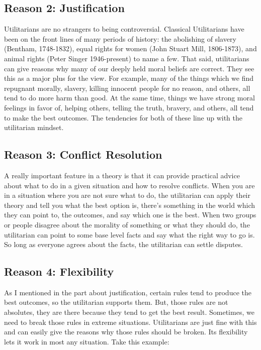 \subsection{Reason 2: Justification}

Utilitarians are no strangers to being controversial. Classical Utilitarians have been on the front lines of many periods of history: the abolishing of slavery (Bentham, 1748-1832), equal rights for women (John Stuart Mill, 1806-1873), and animal rights (Peter Singer 1946-present) to name a few. That said, utilitarians can give reasons why many of our deeply held moral beliefs are correct. They see this as a major plus for the view. For example, many of the things which we find repugnant morally, slavery, killing innocent people for no reason, and others, all tend to do more harm than good. At the same time, things we have strong moral feelings in favor of, helping others, telling the truth, bravery, and others, all tend to make the best outcomes. The tendencies for both of these line up with the utilitarian mindset.
\subsection{Reason 3: Conflict Resolution}

A really important feature in a theory is that it can provide practical advice about what to do in a given situation and how to resolve conflicts. When you are in a situation where you are not sure what to do, the utilitarian can apply their theory and tell you what the best option is, there’s something in the world which they can point to, the outcomes, and say which one is the best. When two groups or people disagree about the morality of something or what they should do, the utilitarian can point to some base level facts and say what the right way to go is. So long as everyone agrees about the facts, the utilitarian can settle disputes.

\subsection{Reason 4: Flexibility}

As I mentioned in the part about justification, certain rules tend to produce the best outcomes, so the utilitarian supports them. But, those rules are not absolutes, they are there because they tend to get the best result. Sometimes, we need to break those rules in extreme situations. Utilitarians are just fine with this and can easily give the reasons why those rules should be broken. Its flexibility lets it work in most any situation. Take this example:

